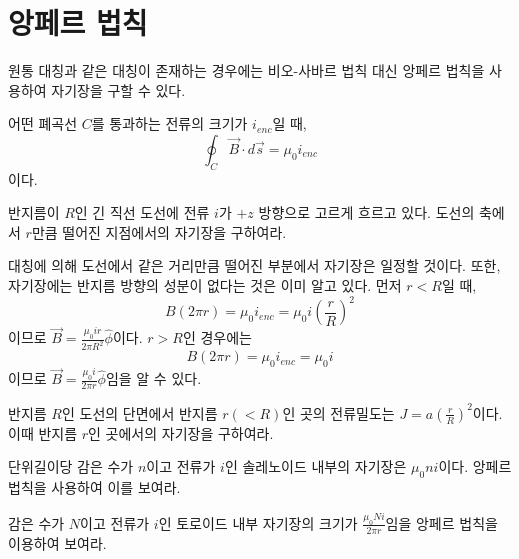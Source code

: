 \section{앙페르 법칙}
원통 대칭과 같은 대칭이 존재하는 경우에는 비오-사바르 법칙 대신 앙페르 법칙을 사용하여 자기장을 구할 수 있다.
\begin{theorem}[앙페르 법칙]
어떤 폐곡선 $C$를 통과하는 전류의 크기가 $i_{enc}$일 때, 
\begin{equation}
\oint_C \vec{B}\cdot d\vec{s} = \mu_0i_{enc}
\end{equation}이다.
\end{theorem}

\begin{example}
반지름이 $R$인 긴 직선 도선에 전류 $i$가 $+z$ 방향으로 고르게 흐르고 있다. 도선의 축에서 $r$만큼 떨어진 지점에서의 자기장을 구하여라.
\end{example}
대칭에 의해 도선에서 같은 거리만큼 떨어진 부분에서 자기장은 일정할 것이다. 또한, 자기장에는 반지름 방향의 성분이 없다는 것은 이미 알고 있다. 먼저 $r<R$일 때,
\begin{equation}
B(2\pi r) = \mu_0 i_{enc}=\mu_0 i\left (\frac{r}{R}\right)^2
\end{equation}
이므로 $\vec{B}=\frac{\mu_0ir}{2\pi R^2}\hat{\phi}$이다. $r>R$인 경우에는
\begin{equation}
B(2\pi r)=\mu_0i_{enc}=\mu_0 i
\end{equation}
이므로 $\vec{B}=\frac{\mu_0i}{2\pi r}\hat{\phi}$임을 알 수 있다.

\begin{problem}
반지름 $R$인 도선의 단면에서 반지름 $r(<R)$인 곳의 전류밀도는 $J=a(\frac{r}{R})^2$이다. 이때 반지름 $r$인 곳에서의 자기장을 구하여라.
\end{problem}
\begin{problem}
단위길이당 감은 수가 $n$이고 전류가 $i$인 솔레노이드 내부의 자기장은 $\mu_0 n i$이다. 앙페르 법칙을 사용하여 이를 보여라.
\end{problem}
\begin{problem}
감은 수가 $N$이고 전류가 $i$인 토로이드 내부 자기장의 크기가 $\frac{\mu_0 N i}{2\pi r}$임을 앙페르 법칙을 이용하여 보여라.
\end{problem}
